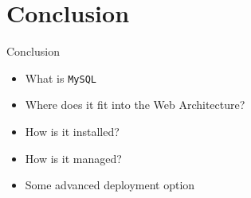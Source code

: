 \documentclass[xcolor=table,aspectratio=169]{beamer}
\begin{document}
\section*{Conclusion}
\begin{frame}{Conclusion}
  \begin{itemize}
    \item What is \texttt{MySQL}
    \item Where does it fit into the Web Architecture?
    \item How is it installed?
    \item How is it managed?
    \item Some advanced deployment option 
  \end{itemize}
\end{frame}
\end{document}
